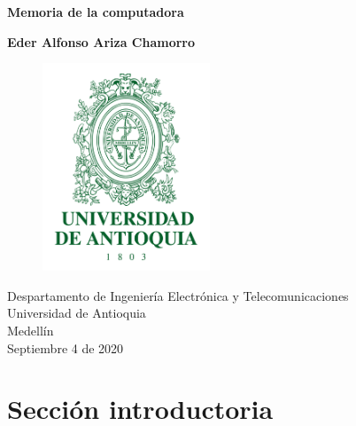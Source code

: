 \documentclass{article}
\begin{document}
	
\begin{titlepage}
	
    \begin{center}
    	
    	\vspace*{1cm}
    	
    	\Huge
    	\textbf{Memoria de la computadora}
    	
    	\vspace{2cm}
    	
    	\LARGE
    	\textbf{Eder Alfonso Ariza Chamorro}
    	
		\vspace*{2cm}
		
    	\begin{figure}[h]
    		\includegraphics[width=5cm]{Logo UdeA.png}
    		\centering
    		\label{fig:Logo UdeA}
    	\end{figure}
    
    	\vspace*{2cm}
    	
    	\Large
    	Despartamento de Ingeniería Electrónica y Telecomunicaciones\\
    	Universidad de Antioquia\\
    	Medellín\\
    	Septiembre 4 de 2020
    	
	\end{center}

\end{titlepage}

\tableofcontents
\newpage
\section{Sección introductoria}\label{intro}
\end{document}
